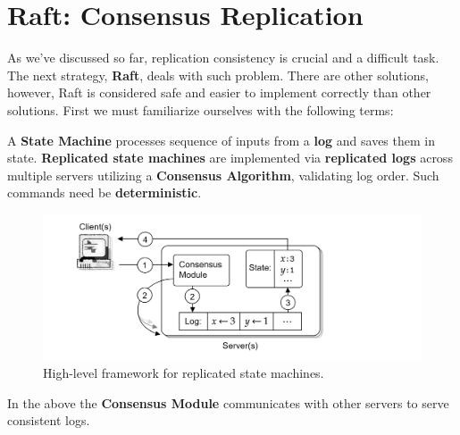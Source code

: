 \section{Raft: Consensus Replication}
As we've discussed so far, replication consistency is crucial and a 
difficult task. The next strategy, \textbf{Raft}, deals with such problem.
There are other solutions, however, Raft is considered safe and easier to 
implement correctly than other solutions. First we must familiarize ourselves with the following terms:
\begin{Def}
    
    A \textbf{State Machine} processes sequence of inputs from a \textbf{log} and saves them
    in state.
    \textbf{Replicated state machines} are implemented via \textbf{replicated logs} across multiple servers
    utilizing a \textbf{Consensus Algorithm}, validating log order. Such commands need be \textbf{deterministic}.
\end{Def}

\vspace{-1.5em}
\begin{figure}[h]
    \centering
    \includegraphics[width=1\textwidth]{Sections/raft/state.png}
    \caption{High-level framework for replicated state machines.}
\end{figure}

\noindent
In the above the \textbf{Consensus Module} communicates with other servers to serve consistent logs. 

\newpage 
